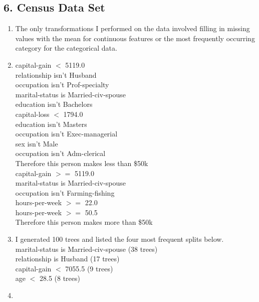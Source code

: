 \documentclass{article}
\begin{document}
\subsection*{6. Census Data Set}
\begin{enumerate}[label=\alph*)]
\item
The only transformations I performed on the data involved filling in missing values with the mean for continuous features or the most frequently occurring category for the categorical data.
\item
capital-gain $<$ 5119.0\\
relationship isn't Husband\\
occupation isn't Prof-specialty\\
marital-status is Married-civ-spouse\\
education isn't Bachelors\\
capital-loss $<$ 1794.0\\
education isn't Masters\\
occupation isn't Exec-managerial\\
sex isn't Male\\
occupation isn't Adm-clerical\\
Therefore this person makes less than \$50k\\

capital-gain $>=$ 5119.0\\
marital-status is Married-civ-spouse\\
occupation isn't Farming-fishing\\
hours-per-week $>=$ 22.0\\
hours-per-week $>=$ 50.5\\
Therefore this person makes more than \$50k\\

\item
I generated 100 trees and listed the four most frequent splits below.\\
marital-status is Married-civ-spouse (38 trees)\\
relationship is Husband (17 trees)\\
capital-gain $<$ 7055.5 (9 trees)\\
age $<$ 28.5 (8 trees)
\newpage
\item


\end{enumerate}
\end{document}
